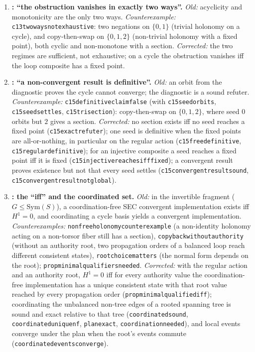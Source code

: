 \documentclass[11pt,a4paper]{article}
\theoremstyle{plain}
\theoremstyle{definition}
\theoremstyle{remark}
\newcommand{\Ho}{H^1}
\renewcommand{\_}{\origunderscore\allowbreak}
\begin{document}
\begin{enumerate}[leftmargin=*, label=\textbf{E\arabic*.}]
\item \textbf{: ``the obstruction vanishes in exactly two ways''.}
  \emph{Old:} acyclicity and monotonicity are the only two ways. \emph{Counterexample:}
  \texttt{c13\_two\_ways\_not\_exhaustive}: two negations on $\{0,1\}$ (trivial holonomy on a cycle),
  and copy-then-swap on $\{0,1,2\}$ (non-trivial holonomy with a fixed point), both cyclic and
  non-monotone with a section. \emph{Corrected:} the two regimes are sufficient, not exhaustive; on a
  cycle the obstruction vanishes iff the loop composite has a fixed point.

\item \textbf{: ``a non-convergent result is definitive''.}
  \emph{Old:} an orbit from the diagnostic proves the cycle cannot converge; the diagnostic is a
  sound refuter. \emph{Counterexample:} \texttt{c15\_definitive\_claim\_false} (with
  \texttt{c15\_seed\_orbits}, \texttt{c15\_seed\_settles}, \texttt{c15\_tri\_section}): copy-then-swap on
  $\{0,1,2\}$, where seed $0$ orbits but $2$ gives a section. \emph{Corrected:} no section exists iff
  no seed reaches a fixed point (\texttt{c15\_exact\_refuter}); one seed is definitive when the fixed
  points are all-or-nothing, in particular on the regular action (\texttt{c15\_free\_definitive},
  \texttt{c15\_regular\_definitive}); for an injective composite a seed reaches a fixed point iff it is
  fixed (\texttt{c15\_injective\_reaches\_iff\_fixed}); a convergent result proves existence but not
  that every seed settles (\texttt{c15\_convergent\_result\_sound},
  \texttt{c15\_convergent\_result\_not\_global}).

\item \textbf{: the ``iff'' and the coordinated set.}
  \emph{Old:} in the invertible fragment ($G \le \mathrm{Sym}(S)$), a coordination-free SEC convergent
  implementation exists iff $\Ho = 0$, and coordinating a cycle basis yields a convergent
  implementation. \emph{Counterexamples:} \texttt{nonfree\_holonomy\_counterexample} (a non-identity
  holonomy acting on a non-torsor fiber still has a section), \texttt{copyback\_without\_authority}
  (without an authority root, two propagation orders of a balanced loop reach different consistent
  states), \texttt{root\_choice\_matters} (the normal form depends on the root);
  \texttt{prop\_minimal\_qualifiers\_needed}. \emph{Corrected:} with the regular action and an
  authority root, $\Ho = 0$ iff for every authority value the coordination-free implementation has a
  unique consistent state with that root value reached by every propagation order
  (\texttt{prop\_minimal\_qualified\_iff}); coordinating the unbalanced non-tree edges of a rooted
  spanning tree is sound and exact relative to that tree (\texttt{coordinated\_sound},
  \texttt{coordinated\_unique\_nf}, \texttt{plan\_exact}, \texttt{coordination\_needed}), and local
  events converge under the plan when the root's events commute
  (\texttt{coordinated\_events\_converge}).


\end{enumerate}
\end{document}
